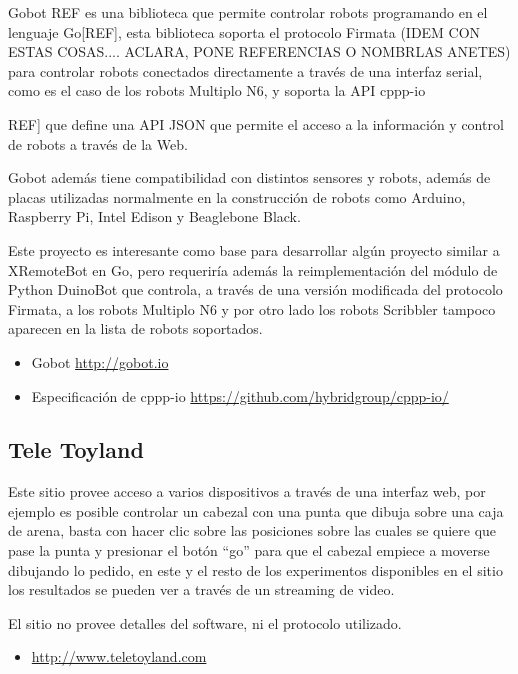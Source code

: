 Gobot {REF} es una biblioteca que permite controlar robots programando en el lenguaje
Go[REF], esta biblioteca soporta el protocolo Firmata (IDEM CON ESTAS COSAS.... ACLARA, PONE REFERENCIAS O NOMBRLAS ANETES) para controlar robots
conectados directamente a través de una interfaz serial, como es el caso
de los robots Multiplo N6, y soporta la API cppp-io{REF] que define una API JSON
que permite el acceso a la información y control de robots a través de la Web.

Gobot además tiene compatibilidad con distintos sensores y robots, además de
placas utilizadas normalmente en la construcción de robots como Arduino,
Raspberry Pi, Intel Edison y Beaglebone Black.

Este proyecto es interesante como base para desarrollar algún proyecto
similar a XRemoteBot en Go, pero requeriría además la reimplementación
del módulo de Python DuinoBot que controla, a través de una versión
modificada del protocolo Firmata, a los robots Multiplo N6 y por otro
lado los robots Scribbler tampoco aparecen en la lista de robots soportados.

\begin{itemize}
    \item Gobot \url{http://gobot.io}
    \item Especificación de cppp-io \url{https://github.com/hybridgroup/cppp-io/}
\end{itemize}

\subsection{Tele Toyland}

Este sitio provee acceso a varios dispositivos a través de una interfaz web,
por ejemplo es posible controlar un cabezal con una punta que dibuja sobre
una caja de arena, basta con hacer clic sobre las posiciones sobre las cuales
se quiere que pase la punta y presionar el botón ``go'' para que el cabezal
empiece a moverse dibujando lo pedido, en este y el resto de los experimentos
disponibles en el sitio los resultados se pueden ver a través de un streaming
de video.

El sitio no provee detalles del software, ni el protocolo utilizado.

\begin{itemize}
    \item \url{http://www.teletoyland.com}
\end{itemize}

}
